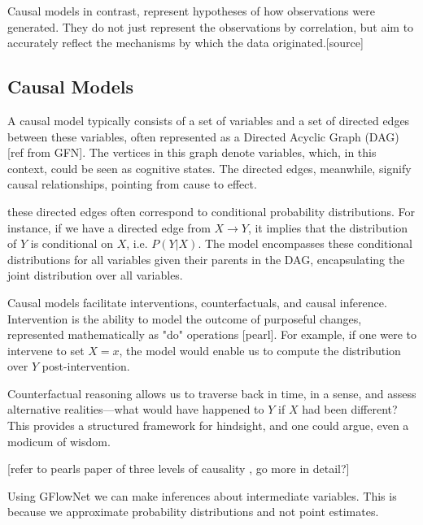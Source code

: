 Causal models in contrast, represent hypotheses of how observations were generated. They do not just represent the observations by correlation, but aim to accurately reflect the mechanisms by which the data originated.[source]



\subsection{Causal Models}
A causal model typically consists of a set of variables and a set of directed edges between these variables, often represented as a Directed Acyclic Graph (DAG) [ref from GFN]. The vertices in this graph denote variables, which, in this context, could be seen as cognitive states. The directed edges, meanwhile, signify causal relationships, pointing from cause to effect.

these directed edges often correspond to conditional probability distributions. For instance, if we have a directed edge from 
$X \to Y$, it implies that the distribution of 
$Y$ is conditional on $X$, i.e. $P(Y \vert X)$. The model encompasses these conditional distributions for all variables given their parents in the DAG, encapsulating the joint distribution over all variables.

Causal models facilitate interventions, counterfactuals, and causal inference. Intervention is the ability to model the outcome of purposeful changes, represented mathematically as "do" operations [pearl]. For example, if one were to intervene to set 
$X = x$, the model would enable us to compute the distribution over $Y$ post-intervention.

Counterfactual reasoning allows us to traverse back in time, in a sense, and assess alternative realities—what would have happened to $Y$ if $X$ had been different? This provides a structured framework for hindsight, and one could argue, even a modicum of wisdom.

[refer to pearls paper of three levels of causality \cite{Pearl_2018}, go more in detail?]

Using GFlowNet we can make inferences about intermediate variables. This is because we approximate probability distributions and not point estimates.















